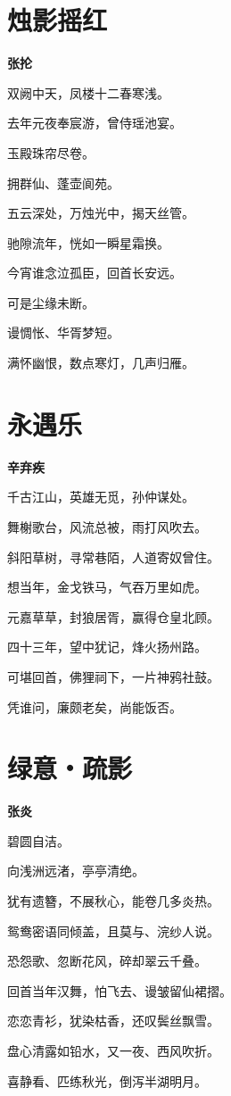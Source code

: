 \documentclass[12pt,a4paper]{ctexbook}
\begin{document}
\section{烛影摇红}
\textbf{张抡}\par\vspace{0.5em}
双阙中天，凤楼十二春寒浅。\par
去年元夜奉宸游，曾侍瑶池宴。\par
玉殿珠帘尽卷。\par
拥群仙、蓬壶阆苑。\par
五云深处，万烛光中，揭天丝管。\par
驰隙流年，恍如一瞬星霜换。\par
今宵谁念泣孤臣，回首长安远。\par
可是尘缘未断。\par
谩惆怅、华胥梦短。\par
满怀幽恨，数点寒灯，几声归雁。\par

\section{永遇乐}
\textbf{辛弃疾}\par\vspace{0.5em}
千古江山，英雄无觅，孙仲谋处。\par
舞榭歌台，风流总被，雨打风吹去。\par
斜阳草树，寻常巷陌，人道寄奴曾住。\par
想当年，金戈铁马，气吞万里如虎。\par
元嘉草草，封狼居胥，赢得仓皇北顾。\par
四十三年，望中犹记，烽火扬州路。\par
可堪回首，佛狸祠下，一片神鸦社鼓。\par
凭谁问，廉颇老矣，尚能饭否。\par

\section{绿意・疏影}
\textbf{张炎}\par\vspace{0.5em}
碧圆自洁。\par
向浅洲远渚，亭亭清绝。\par
犹有遗簪，不展秋心，能卷几多炎热。\par
鸳鸯密语同倾盖，且莫与、浣纱人说。\par
恐怨歌、忽断花风，碎却翠云千叠。\par
回首当年汉舞，怕飞去、谩皱留仙裙摺。\par
恋恋青衫，犹染枯香，还叹鬓丝飘雪。\par
盘心清露如铅水，又一夜、西风吹折。\par
喜静看、匹练秋光，倒泻半湖明月。\par
\end{document}
